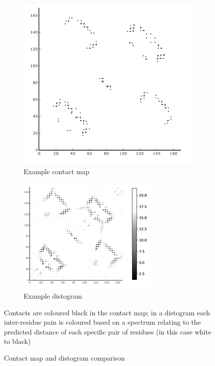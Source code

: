 \begin{figure}[htb]
\begin{subfigure}{0.5\textwidth}
  \includegraphics[width=\linewidth]{introduction/contact_map.png}
  \caption{Example contact map}
  \label{fig:4yms}
\end{subfigure}\hfil %
\begin{subfigure}{0.55\textwidth}
  \includegraphics[width=\linewidth]{introduction/distogram.png}
  \caption{Example distogram}
  \label{fig:5do7}
\end{subfigure}\hfil %
\caption{Contact map and distogram comparison}
\small{Contacts are coloured black in the contact map; in a distogram each inter-residue pain is coloured based on a spectrum relating to the predicted distance of each specific pair of residues (in this case white to black)}
\label{fig:distogram}
\end{figure}


